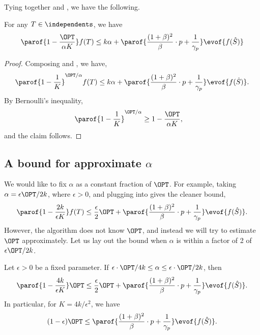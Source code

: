 \documentclass[oneside,letterpaper]{scrartcl} \usepackage{macros}
\begin{document}
Tying together  and
, we have the following.
\begin{lemma} For any $T \in \independents$, we have
  \begin{align*}
    \parof{1 - \frac{\OPT}{\alpha \bufferlimit}} f(T) \leq k \alpha + \parof{\frac{(1 + \beta)^2}{\beta} \cdot p +
      \frac{1}{\offlineratio}} \evof{f(\bestset)}
  \end{align*}
\end{lemma}
\begin{proof}
  Composing  and
  , we have,
  \begin{align*}
    \parof{1 - \frac{1}{\bufferlimit}}^{\OPT/\alpha} f(T) \leq k \alpha + \parof{\frac{(1 + \beta)^2}{\beta} \cdot p +
      \frac{1}{\offlineratio}} \evof{f(\bestset)}.
  \end{align*}
  By Bernoulli's inequality,
  \begin{align*}
    \parof{1 - \frac{1}{\bufferlimit}}^{\OPT/\alpha} &\geq 1 - \frac{\OPT}{\alpha \bufferlimit},
  \end{align*}
  and the claim follows.
\end{proof}

\subsection{A bound for approximate $\alpha$}
  We would like to fix $\alpha$ as a constant fraction of $\OPT$. For
example, taking $\alpha = \epsilon \OPT / 2 k$, where $\epsilon > 0$,
and plugging into  gives
the cleaner bound,
\begin{align*}
  \parof{1 - \frac{2 k}{\epsilon K}} f(T) \leq \frac{\epsilon}{2} \OPT + \parof{\frac{(1 + \beta)^2}{\beta} \cdot p
    + \frac{1}{\offlineratio}} \evof{f(\bestset)}.
\end{align*}
However, the algorithm does not know $\OPT$, and instead we will try
to estimate $\OPT$ approximately. Let us lay out the bound when
$\alpha$ is within a factor of 2 of $\epsilon \OPT / 2k$.
\begin{lemma}
  Let $\epsilon > 0$ be a fixed parameter.  If $\epsilon \cdot \OPT /
  4 k \leq \alpha \leq \epsilon \cdot \OPT / 2 k$, then
  \begin{align*}
    \parof{1 - \frac{4 k}{\epsilon K}}\OPT \leq \frac{\epsilon}{2} \OPT + \parof{\frac{(1 + \beta)^2}{\beta} \cdot
      p + \frac{1}{\offlineratio}} \evof{f(\bestset)}.
  \end{align*}
  In particular, for $K = 4 k / \epsilon^2$, we have
  \begin{align*}
    (1 - \epsilon) \OPT \leq \parof{\frac{(1 + \beta)^2}{\beta} \cdot
      p + \frac{1}{\offlineratio}} \evof{f(\bestset)}.
  \end{align*}
\end{lemma}
\end{document}
